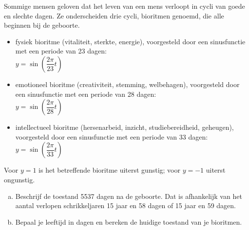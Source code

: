 \documentclass[a4paper,12pt,twoside]{article}
\begin{document}
\begin{oefening}
  Sommige mensen geloven dat het leven van een mens verloopt in cycli van goede en slechte dagen. Ze onderscheiden drie cycli, bioritmen genoemd, die alle beginnen bij de geboorte.
\begin{itemize}
  \item fysiek bioritme (vitaliteit, sterkte, energie), voorgesteld door een sinusfunctie met een periode van 23 dagen:\\
    $y=\sin\left(\dfrac{2\pi}{23}t\right)$
   \item emotioneel bioritme (creativiteit, stemming, welbehagen), voorgesteld door een sinusfunctie met een periode van 28 dagen:\\
    $y=\sin\left(\dfrac{2\pi}{28}t\right)$
   \item intellectueel bioritme (hersenarbeid, inzicht, studiebereidheid, geheugen), voorgesteld door een sinusfunctie met een periode van 33 dagen:\\
    $y=\sin\left(\dfrac{2\pi}{33}t\right)$
\end{itemize}
Voor $y=1$ is het betreffende bioritme uiterst gunstig; voor $y=-1$ uiterst ongunstig.\\
\begin{enumerate}[(a)]
  \item Beschrijf de toestand 5537 dagen na de geboorte. Dat is afhankelijk van het aantal verlopen schrikkeljaren 15 jaar en 58 dagen of 15 jaar en 59 dagen.
  \item Bepaal je leeftijd in dagen en bereken de huidige toestand van je bioritmen.
\end{enumerate}
\end{oefening}
\end{document}
